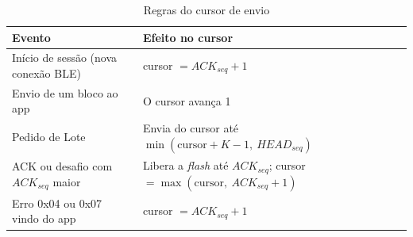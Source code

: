 \documentclass[
	12pt,
	article,			%
	oneside,
	a4paper,
	english,
	brazil				%
	]{abntex2}
\begin{document}
\begin{table}[H]
	\centering
	\caption{Regras do cursor de envio}
	\label{tab:regras-cursor}
	\begin{tabular}{|>{\raggedright\arraybackslash}m{}|>{\raggedright\arraybackslash}m{}|}
		\hline
		\textbf{Evento} & \textbf{Efeito no cursor} \\
		\hline
		Início de sessão (nova conexão BLE) & cursor $= ACK_{seq} + 1$ \\
		\hline
		Envio de um bloco ao app & O cursor avança 1 \\
		\hline
		Pedido de Lote & Envia do cursor até $\min(\text{cursor} + K - 1,\ HEAD_{seq})$ \\
		\hline
		ACK ou desafio com $ACK_{seq}$ maior & Libera a \textit{flash} até $ACK_{seq}$; cursor $= \max(\text{cursor},\ ACK_{seq} + 1)$ \\
		\hline
		Erro 0x04 ou 0x07 vindo do app & cursor $= ACK_{seq} + 1$ \\
		\hline
	\end{tabular}
\end{table}
\end{document}
